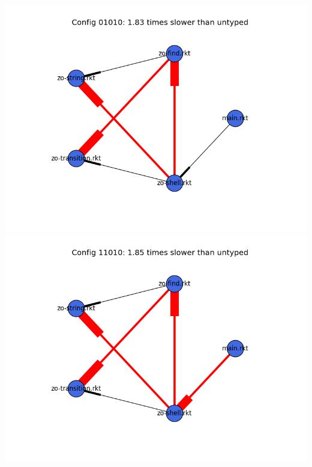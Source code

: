 \documentclass{article}
\begin{document}
\begin{itemize}
\includegraphics[width=\textwidth]{zordoz-2015-04-09-module-graph-01010.png}
\includegraphics[width=\textwidth]{zordoz-2015-04-09-module-graph-11010.png}
\end{itemize}
\end{document}
